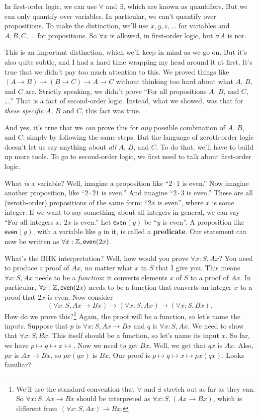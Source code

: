 \documentclass[11pt,paper=letter]{scrartcl}
\newcommand{\sf}{\mathsf}
\begin{document}
In first-order logic, we can use $\forall$ and $\exists$, which are known as quantifiers. But we can only quantify over variables. In particular, we can't quantify over propositions. To make the distinction, we'll use $x, y, z, \dots$ for variables and $A, B, C, \dots$ for propositions. So $\forall x$ is allowed, in first-order logic, but $\forall A$ is not.

This is an important distinction, which we'll keep in mind as we go on. But it's also quite subtle, and I had a hard time wrapping my head around it at first. It's true that we didn't pay too much attention to this. We proved things like $(A \to B) \to (B \to C) \to A \to C$ without thinking too hard about what $A$, $B$, and $C$ are. Strictly speaking, we didn't prove ``For all propositions $A$, $B$, and $C$, \dots.'' That is a fact of second-order logic. Instead, what we showed, was that for \emph{these specific} $A$, $B$ and $C$, this fact was true.

And yes, it's true that we \emph{can} prove this for \emph{any} possible combination of $A$, $B$, and $C$, simply by following the same steps. But the language of zeroth-order logic doesn't let us say anything about \emph{all} $A$, $B$, and $C$. To do that, we'll have to build up more tools. To go to second-order logic, we first need to talk about first-order logic.

What \emph{is} a variable? Well, imagine a proposition like ``$2\cdot1$ is even.'' Now imagine another proposition, like ``$2\cdot21$ is even.'' And imagine ``$2\cdot3$ is even.'' These are all (zeroth-order) propositions of the same form: ``$2x$ is even'', where $x$ is some integer. If we want to say something about all integers in general, we can say ``For all integers $x$, $2x$ is even.'' Let $\sf{even}(y)$ be ``$y$ is even''. A proposition like $\sf{even}(y)$, with a variable like $y$ in it, is called a \textbf{predicate}. Our statement can now be written as $\forall x: \ZZ, \sf{even}(2x)$.

What's the BHK interpretation? Well, how would you prove $\forall x: S, Ax$? You need to produce a proof of $Ax$, no matter what $x$ in $S$ that I give you. This means $\forall x: S, Ax$ needs to be a \emph{function}: it converts elements $x$ of $S$ to a proof of $Ax$. In particular, $\forall x: \ZZ, \sf{even}(2x)$ needs to be a function that converts an integer $x$ to a proof that $2x$ is even. Now consider \[
(\forall x:S, Ax \to Bx) \to (\forall x:S, Ax) \to (\forall x:S, Bx).\] How do we prove this?\footnote{We'll use the standard convention that $\forall$ and $\exists$ stretch out as far as they can. So $\forall x: S, Ax \to Bx$ should be interpreted as $\forall x: S, (Ax \to Bx)$, which is different from $(\forall x: S, Ax) \to Bx$.} Again, the proof will be a function, so let's name the inputs. Suppose that $p$ is $\forall x:S, Ax\to Bx$ and $q$ is $\forall x:S, Ax$. We need to show that $\forall x:S, Bx$. This itself should be a function, so let's name its input $x$. So far, we have $p \mapsto q \mapsto x \mapsto $. Now we need to get $Bx$. Well, we get that $qx$ is $Ax$. Also, $px$ is $Ax \to Bx$, so $px(qx)$ is $Bx$. Our proof is $p \mapsto q \mapsto x \mapsto px(qx)$. Looks familiar?
\end{document}
